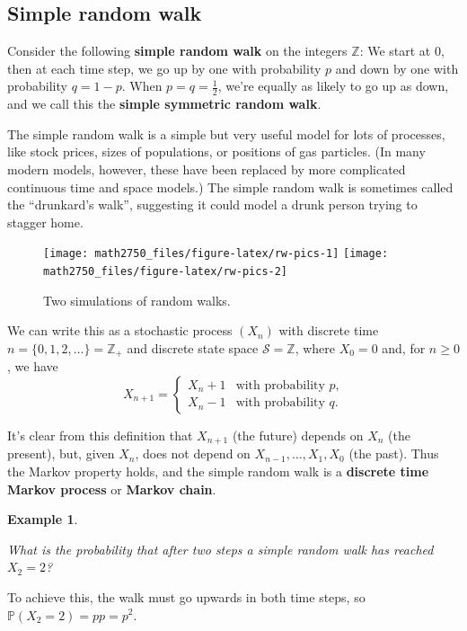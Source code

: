 \documentclass[
  a4paper,
]{article}
\theoremstyle{definition}
\theoremstyle{definition}
\newtheorem{example}{Example}[section]
\theoremstyle{definition}
\theoremstyle{remark}
\begin{document}
\hypertarget{simple-random-walk}{%
\subsection{Simple random walk}\label{simple-random-walk}}

Consider the following \textbf{simple random walk} on the integers \(\mathbb Z\): We start at \(0\), then at each time step, we go up by one with probability \(p\) and down by one with probability \(q = 1-p\). When \(p = q = \frac12\), we're equally as likely to go up as down, and we call this the \textbf{simple symmetric random walk}.

The simple random walk is a simple but very useful model for lots of processes, like stock prices, sizes of populations, or positions of gas particles. (In many modern models, however, these have been replaced by more complicated continuous time and space models.) The simple random walk is sometimes called the ``drunkard's walk'', suggesting it could model a drunk person trying to stagger home.

\begin{figure}
\texttt{[image: math2750\_files/figure-latex/rw-pics-1]} \texttt{[image: math2750\_files/figure-latex/rw-pics-2]} \caption{Two simulations of random walks.}\label{fig:rw-pics}
\end{figure}

We can write this as a stochastic process \((X_n)\) with discrete time \(n = \{0,1,2,\dots\} = \mathbb Z_+\) and discrete state space \(\mathcal S = \mathbb Z\), where \(X_0 = 0\) and, for \(n \geq 0\), we have
\[ X_{n+1} = \begin{cases} X_n + 1 & \text{with probability $p$,} \\
                             X_n - 1 & \text{with probability $q$.} \end{cases} \]

It's clear from this definition that \(X_{n+1}\) (the future) depends on \(X_n\) (the present), but, given \(X_n\), does not depend on \(X_{n-1}, \dots, X_1, X_0\) (the past). Thus the Markov property holds, and the simple random walk is a \textbf{discrete time Markov process} or \textbf{Markov chain}.

\begin{example}
\protect\hypertarget{exm:rw1}{}\label{exm:rw1}

\emph{What is the probability that after two steps a simple random walk has reached \(X_2 = 2\)?}

To achieve this, the walk must go upwards in both time steps, so \(\mathbb P(X_2 = 2) = pp = p^2\).

\end{example}
\end{document}
